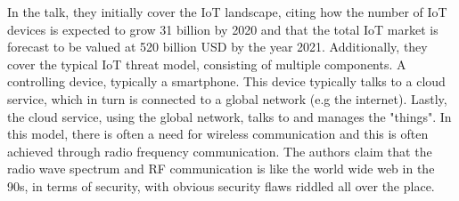 In the talk, they initially cover the IoT landscape, citing how the number of IoT devices is expected to grow 31 billion by 2020 and that the total IoT market is forecast to be valued at 520 billion USD by the year 2021. Additionally, they cover the typical IoT threat model, consisting of multiple components. A controlling device, typically a smartphone. This device typically talks to a cloud service, which in turn is connected to a global network (e.g the internet). Lastly, the cloud service, using the global network, talks to and manages the "things". In this model, there is often a need for wireless communication and this is often achieved through radio frequency communication. The authors claim that the radio wave spectrum and RF communication is like the world wide web in the 90s, in terms of security, with obvious security flaws riddled all over the place.

